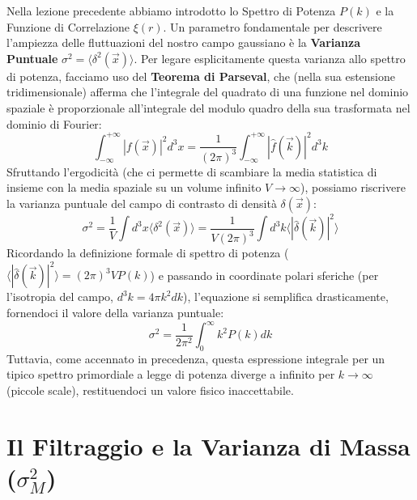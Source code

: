 \documentclass[11pt,a4paper]{report}
\begin{document}
Nella lezione precedente abbiamo introdotto lo Spettro di Potenza $P(k)$ e la Funzione di Correlazione $\xi(r)$. Un parametro fondamentale per descrivere l'ampiezza delle fluttuazioni del nostro campo gaussiano è la \textbf{Varianza Puntuale} $\sigma^2 = \langle \delta^2(\vec{x}) \rangle$.
Per legare esplicitamente questa varianza allo spettro di potenza, facciamo uso del \textbf{Teorema di Parseval}, che (nella sua estensione tridimensionale) afferma che l'integrale del quadrato di una funzione nel dominio spaziale è proporzionale all'integrale del modulo quadro della sua trasformata nel dominio di Fourier:
\begin{equation}
\int_{-\infty}^{+\infty} |f(\vec{x})|^2 d^3x = \frac{1}{(2\pi)^3} \int_{-\infty}^{+\infty} |\hat{f}(\vec{k})|^2 d^3k
\end{equation}
Sfruttando l'ergodicità (che ci permette di scambiare la media statistica di insieme con la media spaziale su un volume infinito $V \to \infty$), possiamo riscrivere la varianza puntuale del campo di contrasto di densità $\delta(\vec{x})$:
\begin{equation}
\sigma^2 = \frac{1}{V} \int d^3x \langle \delta^2(\vec{x}) \rangle = \frac{1}{V (2\pi)^3} \int d^3k \langle |\hat{\delta}(\vec{k})|^2 \rangle
\end{equation}
Ricordando la definizione formale di spettro di potenza ($\langle |\hat{\delta}(\vec{k})|^2 \rangle = (2\pi)^3 V P(k)$) e passando in coordinate polari sferiche (per l'isotropia del campo, $d^3k = 4\pi k^2 dk$), l'equazione si semplifica drasticamente, fornendoci il valore della varianza puntuale:
\begin{equation}
\sigma^2 = \frac{1}{2\pi^2} \int_0^\infty k^2 P(k) dk
\end{equation}
Tuttavia, come accennato in precedenza, questa espressione integrale per un tipico spettro primordiale a legge di potenza diverge a infinito per $k \to \infty$ (piccole scale), restituendoci un valore fisico inaccettabile.

\section{Il Filtraggio e la Varianza di Massa ($\sigma_M^2$)}
\end{document}
